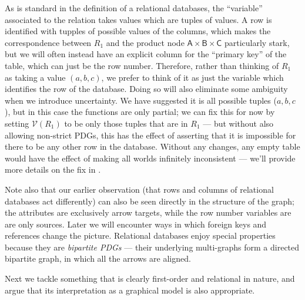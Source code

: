\documentclass{article}
\theoremstyle{definition}
\theoremstyle{remark}
\newcommand{\V}{\mathcal V}
\newcommand{\var}[1]{\mathsf{#1}}
\begin{document}
\begin{example}
    As is standard in the definition of a relational databases, the ``variable'' associated to the relation takes values which are tuples of values. A row is identified with tupples of possible values of the columns, which makes the correspondence between $R_1$ and the product node $\var{A \times B \times C}$ particularly stark, but we will often instead have an explicit column for the ``primary key'' of the table, which can just be the row number. Therefore, rather than thinking of $R_1$ as taking a value $(a,b,c)$, we prefer to think of it as just the variable which identifies the row of the database. Doing so will also eliminate some ambiguity when we introduce uncertainty.
    We have suggested it is all possible tuples ($a,b,c$), but in this case the functions are only partial; we can fix this for now by setting $\V(R_1)$ to be only those tuples that are in $R_1$ --- but without also allowing non-strict PDGs, this has the effect of asserting that it is impossible for there to be any other row in the database. Without any changes, any empty table would have the effect of making all worlds infinitely inconsistent --- we'll provide more details on the fix in .
        
    Note also that our earlier observation (that rows and columns of relational databases act differently) can also be seen directly in the structure of the graph; the attributes are exclusively arrow targets, while the row number variables are are only sources. Later we will encounter ways in which foreign keys and references change the picture. Relational databases enjoy special properties because they are \emph{bipartite PDGs} --- their underlying multi-graphs form a directed bipartite graph, in which all the arrows are aligned.
    
    

\end{example}

Next we tackle something that is clearly first-order and relational in nature, and argue that its interpretation as a graphical model is also appropriate.
\end{document}
